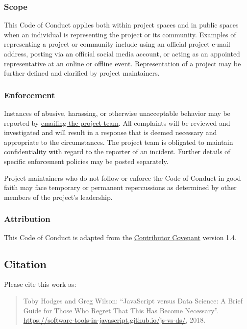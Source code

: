 \subsubsection{Scope}\label{s:conduct-scope}

This Code of Conduct applies both within project spaces and in public
spaces when an individual is representing the project or its community.
Examples of representing a project or community include using an
official project e-mail address, posting via an official social media
account, or acting as an appointed representative at an online or
offline event. Representation of a project may be further defined and
clarified by project maintainers.

\subsubsection{Enforcement}\label{s:conduct-enforcement}

Instances of abusive, harassing, or otherwise unacceptable behavior may
be reported by \href{gvwilson@third-bit.com}{emailing the project team}.
All complaints will be reviewed and investigated and will result in a
response that is deemed necessary and appropriate to the circumstances.
The project team is obligated to maintain confidentiality with regard to
the reporter of an incident. Further details of specific enforcement
policies may be posted separately.

Project maintainers who do not follow or enforce the Code of Conduct in
good faith may face temporary or permanent repercussions as determined
by other members of the project's leadership.

\subsubsection{Attribution}\label{s:conduct-attribution}

This Code of Conduct is adapted from the
\href{https://www.contributor-covenant.org}{Contributor Covenant}
version 1.4.

\subsection{Citation}\label{s:citation}

Please cite this work as:

\begin{quote}
Toby Hodges and Greg Wilson: ``JavaScript versus Data Science: A Brief
Guide for Those Who Regret That This Has Become Necessary''.
\url{https://software-tools-in-javascript.github.io/js-vs-ds/}, 2018.
\end{quote}

